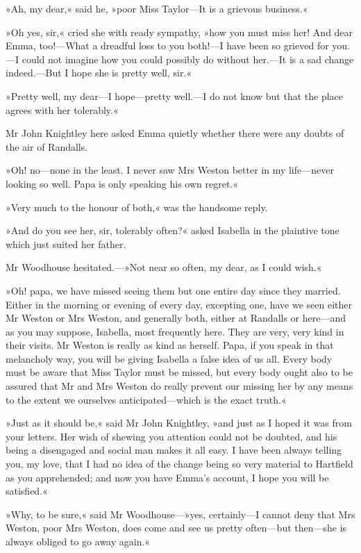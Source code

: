 »Ah, my dear,« said he, »poor Miss Taylor—It is a grievous business.«

»Oh yes, sir,« cried she with ready sympathy, »how you must miss her! And dear Emma, too!—What a dreadful loss to you both!—I have been so grieved for you.—I could not imagine how you could possibly do without her.—It is a sad change indeed.—But I hope she is pretty well, sir.«

»Pretty well, my dear—I hope—pretty well.—I do not know but that the place agrees with her tolerably.«

Mr John Knightley here asked Emma quietly whether there were any doubts of the air of Randalls.

»Oh! no—none in the least. I never saw Mrs Weston better in my life—never looking so well. Papa is only speaking his own regret.«

»Very much to the honour of both,« was the handsome reply.

»And do you see her, sir, tolerably often?« asked Isabella in the plaintive tone which just suited her father.

Mr Woodhouse hesitated.—»Not near so often, my dear, as I could wish.«

»Oh! papa, we have missed seeing them but one entire day since they married. Either in the morning or evening of every day, excepting one, have we seen either Mr Weston or Mrs Weston, and generally both, either at Randalls or here—and as you may suppose, Isabella, most frequently here. They are very, very kind in their visits. Mr Weston is really as kind as herself. Papa, if you speak in that melancholy way, you will be giving Isabella a false idea of us all. Every body must be aware that Miss Taylor must be missed, but every body ought also to be assured that Mr and Mrs Weston do really prevent our missing her by any means to the extent we ourselves anticipated—which is the exact truth.«

»Just as it should be,« said Mr John Knightley, »and just as I hoped it was from your letters. Her wish of shewing you attention could not be doubted, and his being a disengaged and social man makes it all easy. I have been always telling you, my love, that I had no idea of the change being so very material to Hartfield as you apprehended; and now you have Emma's account, I hope you will be satisfied.«

»Why, to be sure,« said Mr Woodhouse—»yes, certainly—I cannot deny that Mrs Weston, poor Mrs Weston, does come and see us pretty often—but then—she is always obliged to go away again.«

